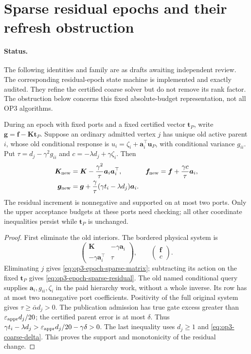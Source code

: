 \section{Sparse residual epochs and their refresh obstruction}
\label{sec:op3-coarse-residual-epochs}

\paragraph{Status.}
The following identities and family are \statusproved{} as drafts awaiting
independent review. The corresponding residual-epoch state machine is
implemented and exactly audited. They refine the certified coarse solver
but do not remove its rank factor. The obstruction below concerns this
fixed absolute-budget representation, not all OP3 algorithms.

\begin{lemma}
\label{lem:op3-sparse-residual-epoch}
During an epoch with fixed ports and a fixed certified vector $\bm t_P$,
write $\bm g=\bm f-\bm K\bm t_P$. Suppose an ordinary admitted vertex $j$
has unique old active parent $i$, whose old conditional response is
$u_i=\zeta_i+\bm a_i^\top\bm u_P$, with conditional variance $g_{ii}$.
Put $\tau=d_j-\gamma^2g_{ii}$ and $c=-\lambda d_j+\gamma\zeta_i$.
Then
\begin{align}
 \bm K_{\rm new}&=\bm K-\frac{\gamma^2}{\tau}\bm a_i\bm a_i^\top,
 &\bm f_{\rm new}&=\bm f+\frac{\gamma c}{\tau}\bm a_i,
 \label{eq:op3-epoch-sparse-matrix}\\
 \bm g_{\rm new}&=\bm g+
 \frac{\gamma}{\tau}(\gamma t_i-\lambda d_j)\bm a_i.
 \label{eq:op3-epoch-sparse-residual}
\end{align}
The residual increment is nonnegative and supported on at most two ports.
Only the upper acceptance budgets at these ports need checking; all other
coordinate inequalities persist while $\bm t_P$ is unchanged.
\end{lemma}
\begin{proof}
First eliminate the old interiors. The bordered physical system is
\[
 \begin{pmatrix}\bm K&-\gamma\bm a_i\\
 -\gamma\bm a_i^\top&\tau\end{pmatrix},\qquad
 \begin{pmatrix}\bm f\\c\end{pmatrix}.
\]
Eliminating $j$ gives \cref{eq:op3-epoch-sparse-matrix}; subtracting its
action on the fixed $\bm t_P$ gives \cref{eq:op3-epoch-sparse-residual}.
The old named conditional query supplies $\bm a_i,g_{ii},\zeta_i$ in the
paid hierarchy work, without a whole inverse. Its row has at most two
nonnegative port coefficients. Positivity of the full original system
gives $\tau\geq\bar\alpha d_j>0$.
The publication admission has true gate excess greater than
$\varepsilon_{\mathrm{appr}} d_j/20$; the certified parent error is at most $\delta$.
Thus $\gamma t_i-\lambda d_j>\varepsilon_{\mathrm{appr}} d_j/20-\gamma\delta>0$.
The last inequality uses $d_j\geq1$ and \cref{eq:op3-coarse-delta}.
This proves the support and monotonicity of the residual change.
\end{proof}

